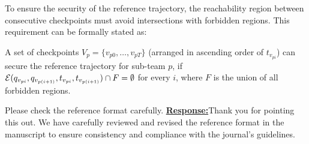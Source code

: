 \documentclass{article}
\newcommand{\re}{\tcblower \underline{\textbf{Response:}}\quad}
\newcommand{\news}{\color{blue}}
\begin{document}
{\news To ensure the security of the reference trajectory, the reachability region between consecutive checkpoints must avoid intersections with forbidden regions. This requirement can be formally stated as:
\begin{remark}\label{rmk:checkpoints}
  A set of checkpoints $V_{p}=\{ v_{p0}, \dots ,v_{pT}\}$ (arranged in ascending order of $t_{v_{pi}}$) can secure the reference trajectory for sub-team $p$, if $\mathcal{E}(q_{v_{pi}}, q_{v_{p(i+1)}}, t_{v_{pi}},t_{v_{p(i+1)}}) \cap F = \emptyset$ for every $i$, where $F$ is the union of all forbidden regions.
  \end{remark}
}
\begin{cmt}{}{}
	Please check the reference format carefully.
	\re Thank you for pointing this out. We have carefully reviewed and revised the reference format in the manuscript to ensure consistency and compliance with the journal's guidelines.
\end{cmt}
\newpage
\end{document}
